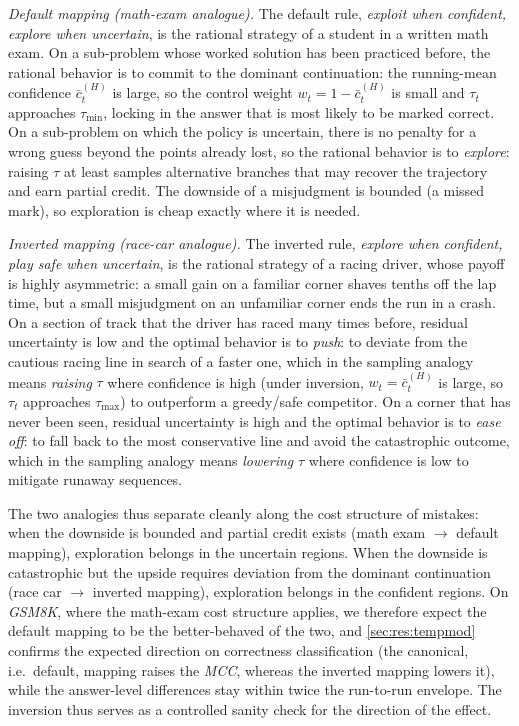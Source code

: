 \documentclass[a4paper,oneside,10pt,english]{scrbook}
\DeclareRobustCommand{\acfit}[1]{\textit{\ac{#1}}}
\begin{document}
\emph{Default mapping (math-exam analogue).} The default rule, \emph{exploit when confident, explore when uncertain}, is the rational strategy of a student in a written math exam. On a sub-problem whose worked solution has been practiced before, the rational behavior is to commit to the dominant continuation: the running-mean confidence $\bar{c}^{(H)}_t$ is large, so the control weight $w_t = 1 - \bar{c}^{(H)}_t$ is small and $\tau_t$ approaches $\tau_{\min}$, locking in the answer that is most likely to be marked correct. On a sub-problem on which the policy is uncertain, there is no penalty for a wrong guess beyond the points already lost, so the rational behavior is to \emph{explore}: raising $\tau$ at least samples alternative branches that may recover the trajectory and earn partial credit. The downside of a misjudgment is bounded (a missed mark), so exploration is cheap exactly where it is needed.

\emph{Inverted mapping (race-car analogue).} The inverted rule, \emph{explore when confident, play safe when uncertain}, is the rational strategy of a racing driver, whose payoff is highly asymmetric: a small gain on a familiar corner shaves tenths off the lap time, but a small misjudgment on an unfamiliar corner ends the run in a crash. On a section of track that the driver has raced many times before, residual uncertainty is low and the optimal behavior is to \emph{push}: to deviate from the cautious racing line in search of a faster one, which in the sampling analogy means \emph{raising} $\tau$ where confidence is high (under inversion, $w_t = \bar{c}^{(H)}_t$ is large, so $\tau_t$ approaches $\tau_{\max}$) to outperform a greedy/safe competitor. On a corner that has never been seen, residual uncertainty is high and the optimal behavior is to \emph{ease off}: to fall back to the most conservative line and avoid the catastrophic outcome, which in the sampling analogy means \emph{lowering} $\tau$ where confidence is low to mitigate runaway sequences.

The two analogies thus separate cleanly along the cost structure of mistakes: when the downside is bounded and partial credit exists (math exam $\to$ default mapping), exploration belongs in the uncertain regions. When the downside is catastrophic but the upside requires deviation from the dominant continuation (race car $\to$ inverted mapping), exploration belongs in the confident regions. On \acfit{GSM8K}, where the math-exam cost structure applies, we therefore expect the default mapping to be the better-behaved of the two, and \autoref{sec:res:tempmod} confirms the expected direction on correctness classification (the canonical, i.e.\ default, mapping raises the \acfit{MCC}, whereas the inverted mapping lowers it), while the answer-level differences stay within twice the run-to-run envelope. The inversion thus serves as a controlled sanity check for the direction of the effect.
\end{document}
